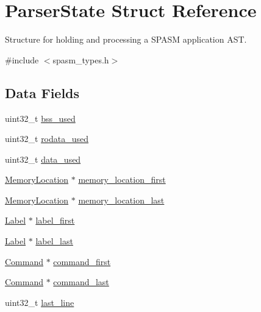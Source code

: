 \hypertarget{struct_parser_state}{\section{\-Parser\-State \-Struct \-Reference}
\label{struct_parser_state}
}


\-Structure for holding and processing a \-S\-P\-A\-S\-M application \-A\-S\-T.  




{\ttfamily \#include $<$spasm\-\_\-types.\-h$>$}

\subsection*{\-Data \-Fields}
\begin{DoxyCompactItemize}
\item 
uint32\-\_\-t \hyperlink{struct_parser_state_ac10c4556abd95773deb418ef3b26fab8}{bss\-\_\-used}
\item 
uint32\-\_\-t \hyperlink{struct_parser_state_a610de7682a50d494f840c335b66b88b7}{rodata\-\_\-used}
\item 
uint32\-\_\-t \hyperlink{struct_parser_state_a228f3fe68f7d2f6b722f8ab6d2d6546a}{data\-\_\-used}
\item 
\hyperlink{struct_memory_location}{\-Memory\-Location} $\ast$ \hyperlink{struct_parser_state_a93f0b2009fa812b3852584e3acf7e3e0}{memory\-\_\-location\-\_\-first}
\item 
\hyperlink{struct_memory_location}{\-Memory\-Location} $\ast$ \hyperlink{struct_parser_state_a5b8f112e7b118b93287c935dbe541224}{memory\-\_\-location\-\_\-last}
\item 
\hyperlink{struct_label}{\-Label} $\ast$ \hyperlink{struct_parser_state_a98486e4d2dad370428a3b93c9d7bd3ae}{label\-\_\-first}
\item 
\hyperlink{struct_label}{\-Label} $\ast$ \hyperlink{struct_parser_state_a6d2388b717a802c8695be589f79db346}{label\-\_\-last}
\item 
\hyperlink{struct_command}{\-Command} $\ast$ \hyperlink{struct_parser_state_a23889d26f95df19cf4fad8ca001a343f}{command\-\_\-first}
\item 
\hyperlink{struct_command}{\-Command} $\ast$ \hyperlink{struct_parser_state_abdb676c62455b934215960211eedc209}{command\-\_\-last}
\item 
uint32\-\_\-t \hyperlink{struct_parser_state_a7cd348383137d4da985c1d17a64ba93c}{last\-\_\-line}
\end{DoxyCompactItemize}


